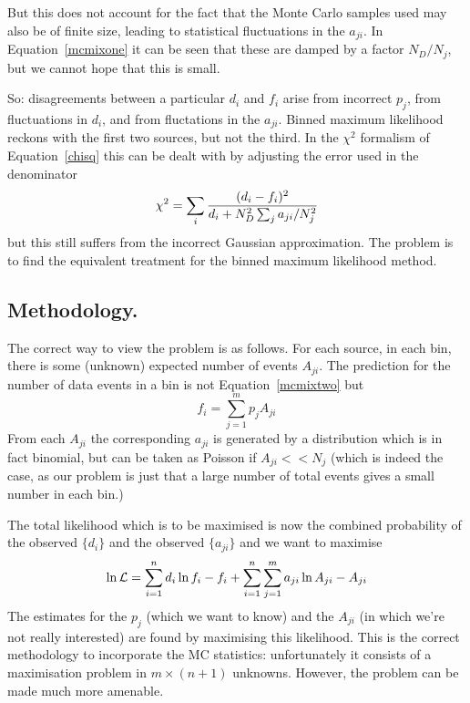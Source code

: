 \begin{changebar}
But this does not account for the fact that the Monte Carlo
samples used may also be of finite size, leading to
statistical fluctuations in the $a_{ji}$.
In Equation~\ref{mcmixone} it can be seen that these are damped
by a factor $N_D/N_j$, but we cannot hope that this is small.
 
So: disagreements between a particular $d_i$ and $f_i$
arise from incorrect $p_j$, from fluctuations
in $d_i$, and from fluctations in the $a_{ji}$.
Binned maximum likelihood
reckons with the first two sources, but not the third.
In the $\chi^2$ formalism of Equation~\ref{chisq} this can be dealt with
by adjusting the error used in the denominator
\begin{equation}
\chi^2 = \sum_i {(d_i-f_i)^2 \over
d_i + N_D^2 \sum_j a_{ji}/N_j^2}
\label{chisqb}
\end{equation}
but this still suffers from the incorrect Gaussian approximation.
The problem is to find the equivalent treatment for the
binned maximum likelihood method.
 
\subsection*{Methodology.}
 
The correct way to view the problem is as follows.  For each source,
in each bin, there is some (unknown) expected number of events $A_{ji}$.
The prediction for the number of data events in a bin is
not Equation~\ref{mcmixtwo} but
\begin{equation}
f_i = \sum_{j=1}^m p_j A_{ji} \label{mcmixthree}
\end{equation}
From each $A_{ji}$ the corresponding $a_{ji}$ is generated
by a distribution which is in fact binomial, but can be taken as
Poisson if $A_{ji}<<N_j$ (which is indeed the case,
as our problem is just that a large number of total events gives
a small number in each bin.)
 
The total likelihood which is to be maximised is now the combined
probability of the observed $\{d_i\}$ and the observed $\{a_{ji}\}$
and we want to maximise
\begin{equation}
\ln {\cal L} = \sum_{i=1}^n d_i \ln f_i - f_i
+ \sum_{i=1}^n \sum_{j=1}^m a_{ji} \ln A_{ji} - A_{ji}
\label{mltwo}
\end{equation}
The estimates for the $p_j$ (which we want to know) and the
$A_{ji}$ (in which we're not really interested) are found
by maximising this likelihood.   This is the correct methodology
to incorporate the MC statistics: unfortunately it consists
of a maximisation problem in $m \times (n+1)$ unknowns.
However, the problem can be made much more amenable.
 

\end{changebar}

